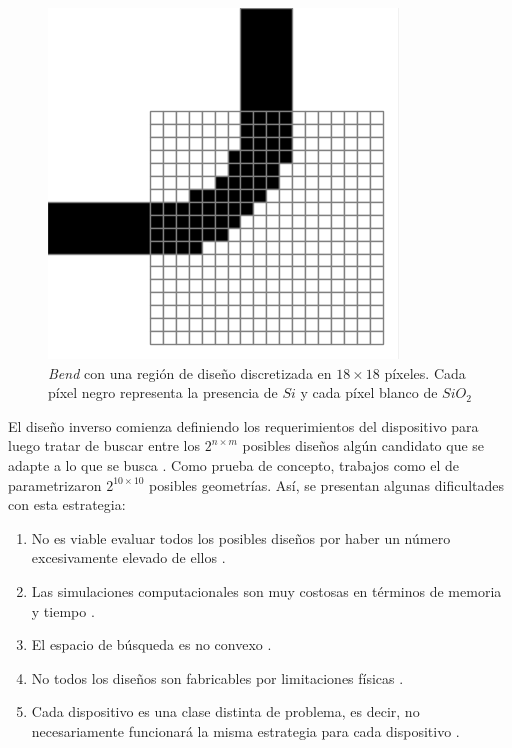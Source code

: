 \begin{figure}[ht]
  \centering
  \includegraphics[scale=0.6]{image/introduction/bend-discretization.png}
  \caption{\emph{Bend} con una región de diseño discretizada en $18 \times 18$ píxeles. Cada píxel negro representa la presencia de $Si$ y cada píxel blanco de $SiO_2$}
  \label{fig:bend-discretization}
\end{figure}

El diseño inverso comienza definiendo los requerimientos del dispositivo para luego tratar de buscar entre los $2^{n \times m}$ posibles diseños algún candidato que se adapte a lo que se busca \citep{Su2020, Molesky2018}.
Como prueba de concepto, trabajos como el de \cite{Malheiros-Silveira2020} parametrizaron $2^{10 \times 10}$ posibles geometrías.
Así, se presentan algunas dificultades con esta estrategia:

\begin{enumerate}
  \item No es viable evaluar todos los posibles diseños por haber un número excesivamente elevado de ellos \citep{Vuckovic2019}.
  \item Las simulaciones computacionales son muy costosas en términos de memoria y tiempo \citep{Kudyshev2020}.
  \item El espacio de búsqueda es no convexo \citep{Su2018}.
  \item No todos los diseños son fabricables por limitaciones físicas \citep{Su2020}.
  \item Cada dispositivo es una clase distinta de problema, es decir, no necesariamente funcionará la misma estrategia para cada dispositivo \citep{Molesky2018}.
\end{enumerate}

